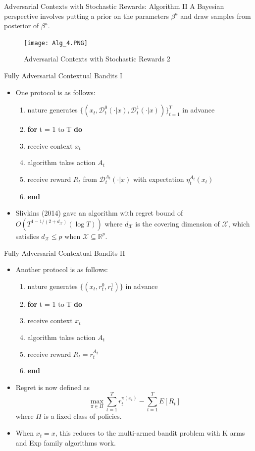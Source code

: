 \documentclass[english]{article}
\begin{document}
\item {Adversarial Contexts with Stochastic Rewards: Algorithm II}
    A Bayesian perspective involves putting a prior on the parameters $\beta^a$ and draw samples from posterior of $\beta^a$. 
    \begin{figure}
        \centering
        \texttt{[image: Alg\_4.PNG]}
        \label{Adversarial Contexts with Stochastic Rewards 2}
        \caption{Adversarial Contexts with Stochastic Rewards 2}
    \end{figure}


\item {Fully Adversarial Contextual Bandits I}
\begin{itemize}
    \item 
One protocol is as follows:
\begin{enumerate}
    \item nature generates $\{(x_t, \mathcal{D}_t^0(\cdot | x), \mathcal{D}_t^1(\cdot | x))\}_{t = 1}^T$ in advance
    \item \textbf{for} t = 1 to T \textbf{do}
    \item \quad receive context $x_t$
    \item \quad algorithm takes action $A_t$
    \item \quad receive reward $R_t$ from $\mathcal{D}_t^{A_t}(\cdot | x)$ with expectation $\eta_t^{A_t}(x_t)$
    \item \textbf{end}
\end{enumerate}
\item 
Slivkins (2014) gave an algorithm with regret bound of $O(T^{1 - 1/(2+d_\mathcal{X})}(\log T) )$ where $d_\mathcal{X}$ is the covering dimension of $\mathcal{X}$, which satisfies $d_\mathcal{X} \leq p$ when $\mathcal{X} \subseteq \mathbb{R} ^p$.
\end{itemize}


\item {Fully Adversarial Contextual Bandits II}
\begin{itemize}
    \item 
    Another protocol is as follows:
\begin{enumerate}
    \item nature generates $\{(x_t, r_t^0, r_t^1)\}$ in advance
    \item \textbf{for} t = 1 to T \textbf{do}
    \item \quad receive context $x_t$
    \item \quad algorithm takes action $A_t$
    \item \quad receive reward $R_t = r_t^{A_t}$
    \item \textbf{end}
\end{enumerate}
\item 
Regret is now defined as \[
\max_{\pi \in \Pi} \sum_{t = 1}^T r_t^{\pi(x_t)} - \sum_{t = 1}^T E[R_t]
\] where $\Pi$ is a fixed class of policies.
\item
When $x_t = x$, this reduces to the multi-armed bandit problem with K arms and Exp family algorithms work. 
\end{itemize}
\end{document}
